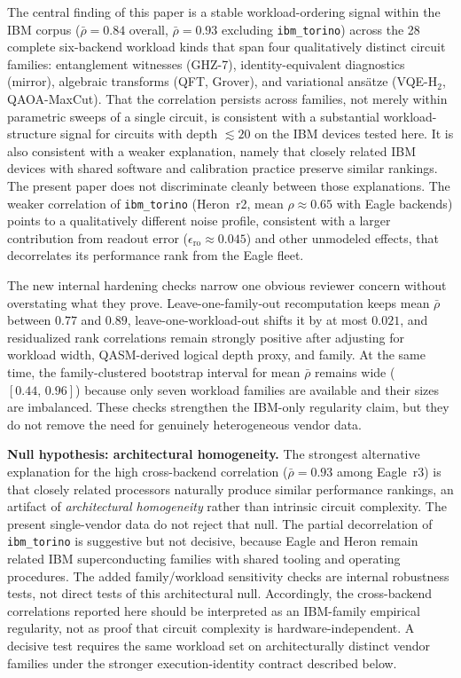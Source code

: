 \documentclass[aps,prxquantum,twocolumn,superscriptaddress,amsmath,amssymb,longbibliography,floatfix]{revtex4-2}
\begin{document}
The central finding of this paper is a stable workload-ordering signal within the IBM corpus ($\bar{\rho} = 0.84$ overall, $\bar{\rho} = 0.93$ excluding \texttt{ibm\_torino}) across the 28 complete six-backend workload kinds that span four qualitatively distinct circuit families: entanglement witnesses (GHZ-7), identity-equivalent diagnostics (mirror), algebraic transforms (QFT, Grover), and variational ansätze (VQE-H$_2$, QAOA-MaxCut). That the correlation persists across families, not merely within parametric sweeps of a single circuit, is consistent with a substantial workload-structure signal for circuits with depth $\lesssim 20$ on the IBM devices tested here. It is also consistent with a weaker explanation, namely that closely related IBM devices with shared software and calibration practice preserve similar rankings. The present paper does not discriminate cleanly between those explanations. The weaker correlation of \texttt{ibm\_torino} (Heron~r2, mean $\rho \approx 0.65$ with Eagle backends) points to a qualitatively different noise profile, consistent with a larger contribution from readout error ($\epsilon_{\text{ro}} \approx 0.045$) and other unmodeled effects, that decorrelates its performance rank from the Eagle fleet.

The new internal hardening checks narrow one obvious reviewer concern without overstating what they prove. Leave-one-family-out recomputation keeps mean $\bar{\rho}$ between $0.77$ and $0.89$, leave-one-workload-out shifts it by at most $0.021$, and residualized rank correlations remain strongly positive after adjusting for workload width, QASM-derived logical depth proxy, and family. At the same time, the family-clustered bootstrap interval for mean $\bar{\rho}$ remains wide ($[0.44,\,0.96]$) because only seven workload families are available and their sizes are imbalanced. These checks strengthen the IBM-only regularity claim, but they do not remove the need for genuinely heterogeneous vendor data.

\textbf{Null hypothesis: architectural homogeneity.} The strongest alternative explanation for the high cross-backend correlation ($\bar{\rho} = 0.93$ among Eagle~r3) is that closely related processors naturally produce similar performance rankings, an artifact of \emph{architectural homogeneity} rather than intrinsic circuit complexity. The present single-vendor data do not reject that null. The partial decorrelation of \texttt{ibm\_torino} is suggestive but not decisive, because Eagle and Heron remain related IBM superconducting families with shared tooling and operating procedures. The added family/workload sensitivity checks are internal robustness tests, not direct tests of this architectural null. Accordingly, the cross-backend correlations reported here should be interpreted as an IBM-family empirical regularity, not as proof that circuit complexity is hardware-independent. A decisive test requires the same workload set on architecturally distinct vendor families under the stronger execution-identity contract described below.
\end{document}
